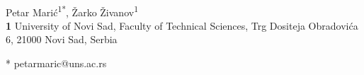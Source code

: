 \\
Petar Marić\textsuperscript{1*},
Žarko Živanov\textsuperscript{1}
\\
\bigskip
\textbf{1} University of Novi Sad, Faculty of Technical Sciences, Trg Dositeja Obradovića 6, 21000 Novi Sad, Serbia
\\
\bigskip

* petarmaric@uns.ac.rs
